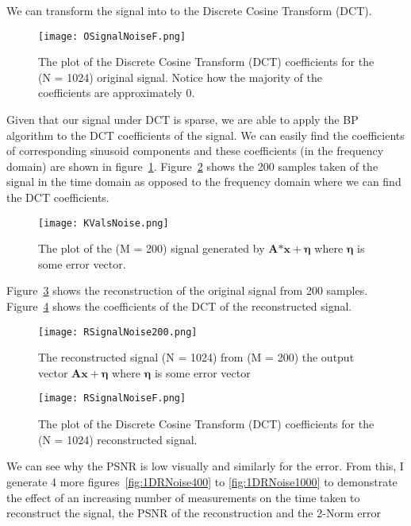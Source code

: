 \documentclass[titlepage,oneside, 12pt]{book}
\theoremstyle{break}
\begin{document}
We can transform the signal into to the Discrete Cosine Transform (DCT).

\begin{figure}[H]
\centering
\centerline{\texttt{[image: OSignalNoiseF.png]}}
\caption{The plot of the Discrete Cosine Transform (DCT) coefficients for the (N = 1024) original signal. Notice how the majority of the coefficients are approximately 0. }
\label{fig:1DONoiseF}
\end{figure}
Given that our signal under DCT is sparse, we are able to apply the BP algorithm to the DCT coefficients of the signal. We can easily find the coefficients of corresponding sinusoid components and these coefficients (in the frequency domain) are shown in figure~\ref{fig:1DONoiseF}.  Figure~\ref{fig:1DKValsNoise} shows the 200 samples taken of the signal in the time domain as opposed to the frequency domain where we can find the DCT coefficients. 

\begin{figure}[H]
\centering
\centerline{\texttt{[image: KValsNoise.png]}}
\caption{The plot of the (M = 200) signal generated by $\textbf{A*x} +\pmb{\eta}$ where $\pmb{\eta}$ is some error vector. }
\label{fig:1DKValsNoise}
\end{figure}

Figure~\ref{fig:1DRNoise} shows the reconstruction of the original signal from 200 samples. Figure~\ref{fig:1DRNoiseF} shows the coefficients of the DCT of the reconstructed signal.  

\begin{figure}[H]
\centering
\centerline{\texttt{[image: RSignalNoise200.png]}}
\caption{The reconstructed signal (N = 1024) from (M = 200) the output vector  $\textbf{Ax} +\pmb{\eta}$ where $\pmb{\eta}$ is some error vector}
\label{fig:1DRNoise}
\end{figure}

\begin{figure}[H]
\centering
\centerline{\texttt{[image: RSignalNoiseF.png]}}
\caption{The plot of the Discrete Cosine Transform (DCT) coefficients for the (N = 1024) reconstructed signal.}
\label{fig:1DRNoiseF}
\end{figure}
\newpage

We can see why the PSNR is low visually and similarly for the error. From this, I generate 4 more figures~\ref{fig:1DRNoise400} to \ref{fig:1DRNoise1000} to demonstrate the effect of an increasing number of measurements on the time taken to reconstruct the signal, the PSNR of the reconstruction and the 2-Norm error
\end{document}
